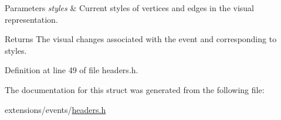 \begin{DoxyParams}{Parameters}
{\em styles} & Current styles of vertices and edges in the visual representation. \\
\hline
\end{DoxyParams}
\begin{DoxyReturn}{Returns}
The visual changes associated with the event and corresponding to {\ttfamily styles}. 
\end{DoxyReturn}


Definition at line 49 of file headers.\+h.



The documentation for this struct was generated from the following file\+:\begin{DoxyCompactItemize}
\item 
extensions/events/\hyperlink{extensions_2events_2headers_8h}{headers.\+h}\end{DoxyCompactItemize}
